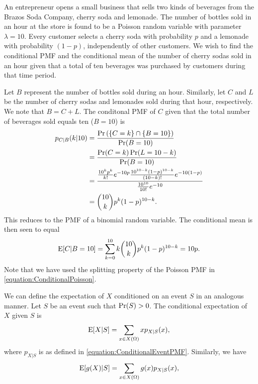 \begin{example}
An entrepreneur opens a small business that sells two kinds of beverages from the Brazos Soda Company, cherry soda and lemonade.
The number of bottles sold in an hour at the store is found to be a Poisson random variable with parameter $\lambda = 10$.
Every customer selects a cherry soda with probability $p$ and a lemonade with probability $(1 - p)$, independently of other customers.
We wish to find the conditional PMF and the conditional mean of the number of cherry sodas sold in an hour given that a total of ten beverages was purchased by customers during that time period.

Let $B$ represent the number of bottles sold during an hour.
Similarly, let $C$ and $L$ be the number of cherry sodas and lemonades sold during that hour, respectively.
We note that $B = C + L$.
The conditonal PMF of $C$ given that the total number of beverages sold equals ten ($B = 10$) is
\begin{equation} \label{equation:ConditionalPoisson}
\begin{split}
p_{C|B} (k | 10)
&= \frac{ \Pr \left( \{ C = k \} \cap \{ B = 10 \} \right) }
{ \Pr (B = 10) } \\
&= \frac{ \Pr ( C = k ) \Pr ( L = 10-k ) }{ \Pr (B = 10) } \\
&= \frac{ \frac{ 10^k p^k }{ k!} e^{-10p}
\frac{10^{10-k} (1-p)^{10-k}}{(10-k)!} e^{-10(1-p)} }
{ \frac{ 10^{10} }{ 10!} e^{-10} } \\
&= \binom{10}{k} p^k (1-p)^{10-k} .
\end{split}
\end{equation}
This reduces to the PMF of a binomial random variable.
The conditional mean is then seen to equal
\begin{equation*}
\mathrm{E} [ C | B=10] = \sum_{k=0}^{10}
k \binom{10}{k} p^k (1-p)^{10-k} = 10 p .
\end{equation*}
Note that we have used the splitting property of the Poisson PMF in \eqref{equation:ConditionalPoisson}.
\end{example}

We can define the expectation of $X$ conditioned on an event $S$ in an analogous manner.
Let $S$ be an event such that $\Pr (S) > 0$.
The conditional expectation of $X$ given $S$ is
\begin{equation*}
\mathrm{E} [X | S] = \sum_{x \in X(\Omega)} x p_{X|S} (x) ,
\end{equation*}
where $p_{X|S}$ is as defined in \eqref{equation:ConditionalEventPMF}.
Similarly, we have
\begin{equation*}
\mathrm{E} [g(X) | S] = \sum_{x \in X(\Omega)} g(x) p_{X|S} (x) ,
\end{equation*}


